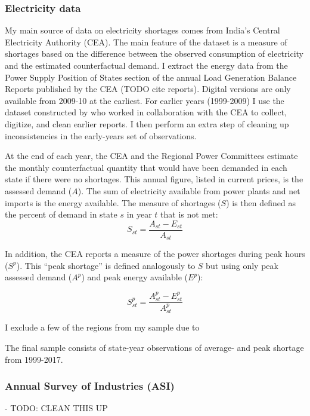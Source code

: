 \documentclass[11pt]{article}
\begin{document}
\subsubsection{Electricity data}%
\label{sub:energy_data}

My main source of data on electricity shortages comes from India's Central Electricity Authority (CEA). The main feature of the dataset is a measure of shortages based on the difference between the observed consumption of electricity and the estimated counterfactual demand. I extract the energy data from the Power Supply Position of States section of the annual Load Generation Balance Reports published by the CEA (TODO cite reports). Digital versions are only available from 2009-10 at the earliest. For earlier years (1999-2009) I use the dataset constructed by \cite{allcott_how_2016} who worked in collaboration with the CEA to collect, digitize, and clean earlier reports. I then perform an extra step of cleaning up inconsistencies in the early-years set of observations. 

At the end of each year, the CEA and the Regional Power Committees estimate the monthly counterfactual quantity that would have been demanded in each state if there were no shortages. This annual figure, listed in current prices, is the assessed demand (\(A\)). The sum of electricity available from power plants and net imports is the energy available. The measure of shortages (\(S\)) is then defined as the percent of demand in state \(s\) in year \(t\) that is not met:
\[
S_{st} = \frac{A_{st} - E_{st} }{A_{st}}
\]

In addition, the CEA reports a measure of the power shortages during peak hours (\(S^p\)). This ``peak shortage'' is defined analogously to \(S\) but using only peak assessed demand (\(A^{p}\)) and peak energy available (\(E^p\)):

\[
S^{p}_{st} = \frac{A^{p}_{st} - E^{p}_{st}}{A^{p}_{st}}
\]

I exclude a few of the regions from my sample due to 

The final sample consists of state-year observations of average- and peak shortage from 1999-2017.

\subsubsection{Annual Survey of Industries (ASI)}%
\label{sub:annual_survey_of_industries_asi}

- TODO: CLEAN THIS UP 
\end{document}
